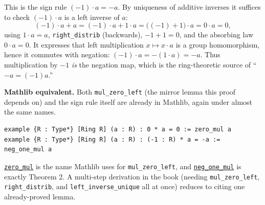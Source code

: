 \begin{mathreading}

This is the sign rule \((-1)\cdot a = -a\). By uniqueness of additive inverses it suffices to check \((-1)\cdot a\) is a left inverse of \(a\): \[
(-1)\cdot a + a = (-1)\cdot a + 1\cdot a = \big((-1) + 1\big)\cdot a
= 0\cdot a = 0,
\] using \(1\cdot a = a\), \texttt{right\_\allowbreak{}distrib} (backwards), \(-1 + 1 = 0\), and the absorbing law \(0\cdot a = 0\). It expresses that left multiplication \(x \mapsto x\cdot a\) is a group homomorphism, hence it commutes with negation: \((-1)\cdot a = -(1\cdot a) = -a\). Thus multiplication by \(-1\) \emph{is} the negation map, which is the ring-theoretic source of ``\(-a = (-1)a\).''

\end{mathreading}

\textbf{Mathlib equivalent.} Both \texttt{mul\_\allowbreak{}zero\_\allowbreak{}left} (the mirror lemma this proof depends on) and the sign rule itself are already in Mathlib, again under almost the same names.

\begin{lstlisting}
example {R : Type*} [Ring R] (a : R) : 0 * a = 0 := zero_mul a
example {R : Type*} [Ring R] (a : R) : (-1 : R) * a = -a := neg_one_mul a
\end{lstlisting}

\href{https://loogle.lean-lang.org/?q=zero_mul}{\texttt{zero\_\allowbreak{}mul}} is the name Mathlib uses for \texttt{mul\_\allowbreak{}zero\_\allowbreak{}left}, and \href{https://loogle.lean-lang.org/?q=neg_one_mul}{\texttt{neg\_\allowbreak{}one\_\allowbreak{}mul}} is exactly Theorem 2. A multi-step derivation in the book (needing \texttt{mul\_\allowbreak{}zero\_\allowbreak{}left}, \texttt{right\_\allowbreak{}distrib}, and \texttt{left\_\allowbreak{}inverse\_\allowbreak{}unique} all at once) reduces to citing one already-proved lemma.
